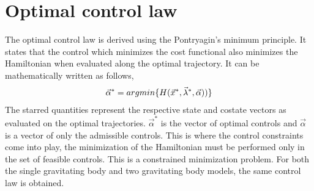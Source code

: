 \section{Optimal control law}
The optimal control law is derived using the Pontryagin's minimum principle. It states that the control which minimizes the cost functional also minimizes the Hamiltonian when evaluated along the optimal trajectory. It can be mathematically written as follows,
\begin{align}
	\vec{\alpha}^{*}=argmin\{\boldmath{H(\vec{x}^*,\vec{\lambda}^*,\vec{\alpha})})\}
\end{align}
The starred quantities represent the respective state and costate vectors as evaluated on the optimal trajectories. $\vec{\alpha}^*$ is the vector of optimal controls and $\vec{\alpha}$ is a vector of only the admissible controls. This is where the control constraints come into play, the minimization of the Hamiltonian must be performed only in the set of feasible controls. This is a constrained minimization problem. 
For both the single gravitating body and two gravitating body models, the same control law is obtained. 
